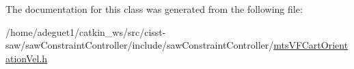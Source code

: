 The documentation for this class was generated from the following file\-:\begin{DoxyCompactItemize}
\item 
/home/adeguet1/catkin\-\_\-ws/src/cisst-\/saw/saw\-Constraint\-Controller/include/saw\-Constraint\-Controller/\hyperlink{mts_v_f_cart_orientation_vel_8h}{mts\-V\-F\-Cart\-Orientation\-Vel.\-h}\end{DoxyCompactItemize}

